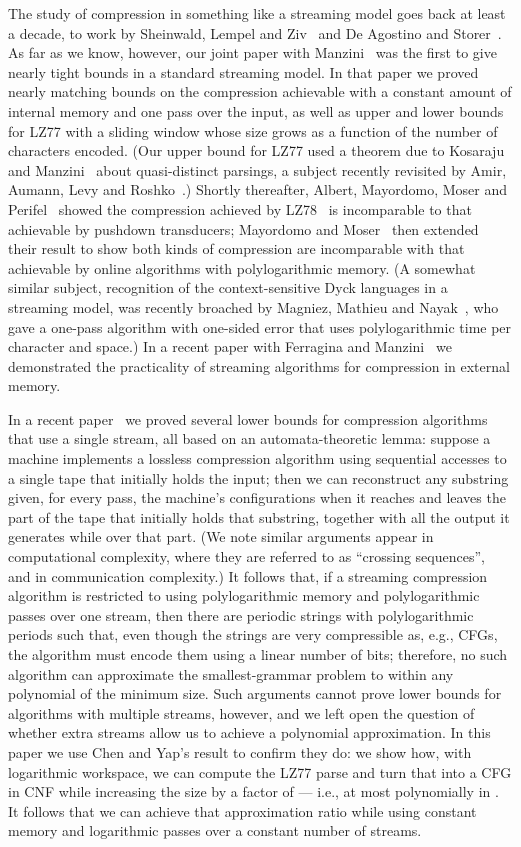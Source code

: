 \documentclass[runningheads]{llncs}
\begin{document}
The study of compression in something like a streaming model goes back at least a decade, to work by Sheinwald, Lempel and Ziv~\cite{SLZ95} and De Agostino and Storer~\cite{DS96}.  As far as we know, however, our joint paper with Manzini~\cite{GM07} was the first to give nearly tight bounds in a standard streaming model.  In that paper we proved nearly matching bounds on the compression achievable with a constant amount of internal memory and one pass over the input, as well as upper and lower bounds for LZ77 with a sliding window whose size grows as a function of the number of characters encoded.  (Our upper bound for LZ77 used a theorem due to Kosaraju and Manzini~\cite{KM99} about quasi-distinct parsings, a subject recently revisited by Amir, Aumann, Levy and Roshko~\cite{AALR09}.)  Shortly thereafter, Albert, Mayordomo, Moser and Perifel~\cite{AMMP08} showed the compression achieved by LZ78~\cite{ZL78} is incomparable to that achievable by pushdown transducers; Mayordomo and Moser~\cite{MM09} then extended their result to show both kinds of compression are incomparable with that achievable by online algorithms with polylogarithmic memory.  (A somewhat similar subject, recognition of the context-sensitive Dyck languages in a streaming model, was recently broached by Magniez, Mathieu and Nayak~\cite{MMN09}, who gave a one-pass algorithm with one-sided error that uses polylogarithmic time per character and  space.)  In a recent paper with Ferragina and Manzini~\cite{FGM10} we demonstrated the practicality of streaming algorithms for compression in external memory.

In a recent paper~\cite{Gag09} we proved several lower bounds for compression algorithms that use a single stream, all based on an automata-theoretic lemma: suppose a machine implements a lossless compression algorithm using sequential accesses to a single tape that initially holds the input; then we can reconstruct any substring given, for every pass, the machine's configurations when it reaches and leaves the part of the tape that initially holds that substring, together with all the output it generates while over that part.  (We note similar arguments appear in computational complexity, where they are referred to as ``crossing sequences'', and in communication complexity.)  It follows that, if a streaming compression algorithm is restricted to using polylogarithmic memory and polylogarithmic passes over one stream, then there are periodic strings with polylogarithmic periods such that, even though the strings are very compressible as, e.g., CFGs, the algorithm must encode them using a linear number of bits; therefore, no such algorithm can approximate the smallest-grammar problem to within any polynomial of the minimum size.  Such arguments cannot prove lower bounds for algorithms with multiple streams, however, and we left open the question of whether extra streams allow us to achieve a polynomial approximation.  In this paper we use Chen and Yap's result to confirm they do: we show how, with logarithmic workspace, we can compute the LZ77 parse and turn that into a CFG in CNF while increasing the size by a factor of  --- i.e., at most polynomially in .  It follows that we can achieve that approximation ratio while using constant memory and logarithmic passes over a constant number of streams.
\end{document}

